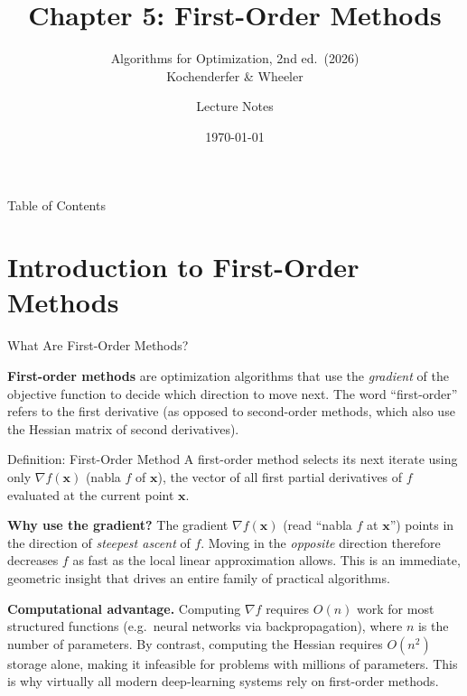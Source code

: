 \documentclass[aspectratio=169,10pt]{beamer}
\title[Ch.\ 5: First-Order Methods]{Chapter 5: First-Order Methods}
\subtitle{Algorithms for Optimization, 2nd ed.\ (2026)\\
          Kochenderfer \& Wheeler}
\author{Lecture Notes}
\date{\today}
\newcommand{\vx}{\mathbf{x}}
\begin{document}
\begin{frame}
  \titlepage
\end{frame}

\begin{frame}{Table of Contents}
  \tableofcontents
\end{frame}

\section{Introduction to First-Order Methods}

\begin{frame}[allowframebreaks]{What Are First-Order Methods?}

  \textbf{First-order methods} are optimization algorithms that use
  the \emph{gradient} of the objective function to decide which
  direction to move next.  The word ``first-order'' refers to the
  first derivative (as opposed to second-order methods, which also
  use the Hessian matrix of second derivatives).

  \begin{block}{Definition: First-Order Method}
    A first-order method selects its next iterate using only
    $\nabla f(\vx)$ (nabla $f$ of $\vx$), the vector of all
    first partial derivatives of $f$ evaluated at the current
    point $\vx$.
  \end{block}

  \textbf{Why use the gradient?}  The gradient $\nabla f(\vx)$
  (read ``nabla $f$ at $\vx$'') points in the direction of
  \emph{steepest ascent} of $f$.  Moving in the \emph{opposite}
  direction therefore decreases $f$ as fast as the local linear
  approximation allows.  This is an immediate, geometric insight
  that drives an entire family of practical algorithms.

  \vspace{0.5em}
  \textbf{Computational advantage.}  Computing $\nabla f$ requires
  $O(n)$ work for most structured functions (e.g.\ neural networks
  via backpropagation), where $n$ is the number of parameters.
  By contrast, computing the Hessian requires $O(n^2)$ storage
  alone, making it infeasible for problems with millions of
  parameters.  This is why virtually all modern deep-learning
  systems rely on first-order methods.


\end{frame}
\end{document}
